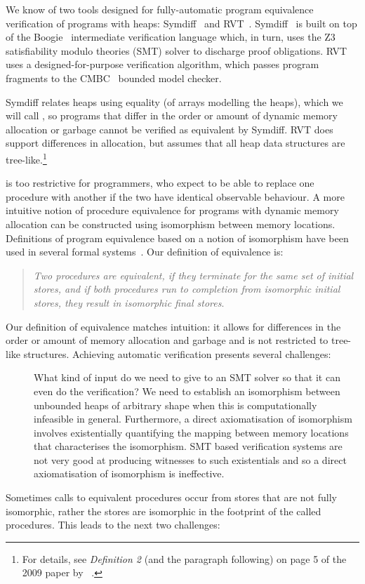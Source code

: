 \documentclass[runningheads,a4paper]{llncs}
\begin{document}
We know of two tools designed for fully-automatic program equivalence verification of programs with heaps: Symdiff~\cite{Lahiri2012} and RVT~\cite{Godlin09}. Symdiff~\cite{Kawaguchi2010,Lahiri2012,Lahiri2013,Hawblitzel2013} is built on top of the Boogie~\cite{Barnett2005} intermediate verification language which, in turn, uses the Z3~\cite{DeMoura2008} satisfiability modulo theories (SMT) solver to discharge proof obligations. RVT uses a designed-for-purpose verification algorithm, which passes program fragments to the CMBC~\cite{Clarke2003} bounded model checker.

Symdiff relates heaps using equality (of arrays modelling the heaps), which we will call \emph{\symdiffequivn{}}, so programs that differ in the order or amount of dynamic memory allocation or garbage cannot be verified as equivalent by Symdiff. RVT does support differences in allocation, but assumes that all heap data structures are tree-like.\footnote{For details, see \emph{Definition 2} (and the paragraph following) on page 5 of the 2009 paper by \citeauthor{Godlin09}~\cite{Godlin09}.}

\Symdiffequivn{} is too restrictive for programmers, who expect to be able to replace one procedure with another if the two have identical observable behaviour. A more intuitive notion of procedure equivalence for programs with dynamic memory allocation can be constructed using isomorphism between memory locations. Definitions of program equivalence based on a notion of isomorphism have been used in several formal systems~\cite{Benton2007,Pitts2002}. Our definition of equivalence is:
 \begin{quote}%
 \emph{Two procedures are {\em equivalent}, if they terminate for the same set of initial stores, and if both procedures run to completion from isomorphic initial stores, they result in isomorphic final stores}. 
 \end{quote}
 Our definition of equivalence matches intuition: it allows for differences in the order or amount of memory allocation and garbage and is not restricted to tree-like structures.
Achieving automatic verification presents several challenges:
\begin{description}
\item[\Cone{}]What kind of input do we need to give to an SMT solver so that it can even do the verification? We need to establish an isomorphism between unbounded heaps of arbitrary shape when this is computationally infeasible in general. Furthermore, a direct axiomatisation of isomorphism involves existentially quantifying the mapping between memory locations that characterises the isomorphism. SMT based verification systems are not very good at producing witnesses to such existentials and so a direct axiomatisation of isomorphism is ineffective.
\end{description}
Sometimes calls to equivalent procedures occur from stores that are not fully isomorphic, rather the stores are isomorphic in the footprint of the called procedures. This leads to the next two challenges:
\end{document}
